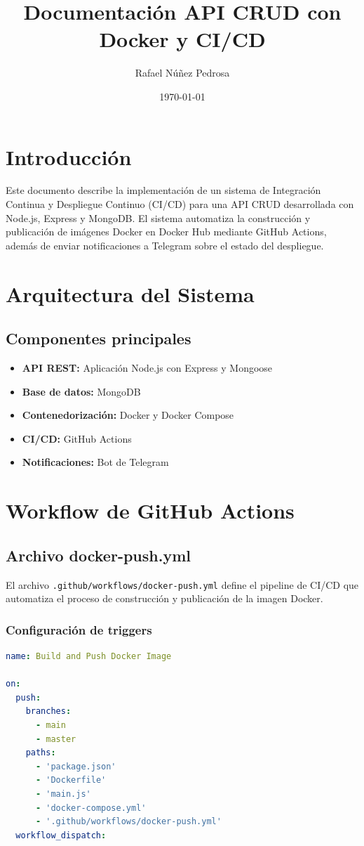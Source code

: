 \documentclass{article}
\title{Documentación API CRUD con Docker y CI/CD}
\author{Rafael Núñez Pedrosa}
\date{\today}
\begin{document}
\maketitle
\tableofcontents
\newpage

\section{Introducción}
Este documento describe la implementación de un sistema de Integración Continua y Despliegue Continuo (CI/CD) para una API CRUD desarrollada con Node.js, Express y MongoDB. El sistema automatiza la construcción y publicación de imágenes Docker en Docker Hub mediante GitHub Actions, además de enviar notificaciones a Telegram sobre el estado del despliegue.

\section{Arquitectura del Sistema}

\subsection{Componentes principales}
\begin{itemize}
    \item \textbf{API REST:} Aplicación Node.js con Express y Mongoose
    \item \textbf{Base de datos:} MongoDB
    \item \textbf{Contenedorización:} Docker y Docker Compose
    \item \textbf{CI/CD:} GitHub Actions
    \item \textbf{Notificaciones:} Bot de Telegram
\end{itemize}

\section{Workflow de GitHub Actions}

\subsection{Archivo docker-push.yml}
El archivo \texttt{.github/workflows/docker-push.yml} define el pipeline de CI/CD que automatiza el proceso de construcción y publicación de la imagen Docker.

\subsubsection{Configuración de triggers}
\begin{lstlisting}[language=yaml,caption={Configuración de eventos que disparan el workflow}]
name: Build and Push Docker Image

on:
  push:
    branches:
      - main
      - master
    paths:
      - 'package.json'
      - 'Dockerfile'
      - 'main.js'
      - 'docker-compose.yml'
      - '.github/workflows/docker-push.yml'
  workflow_dispatch:
\end{lstlisting}
\end{document}
